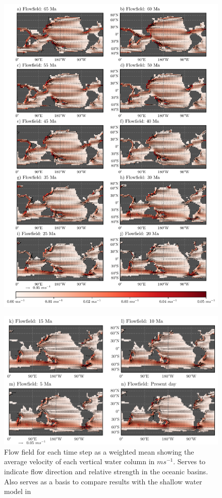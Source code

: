 \documentclass[a4paper]{article}
\begin{document}
\begin{figure}[H]
\includegraphics[width=\linewidth]{flowfield_1.pdf}
\end{figure}
\begin{figure}[H]
\includegraphics[width=\linewidth]{flowfield_2.pdf}
\caption{Flow field for each time step as a weighted mean showing the average velocity of each vertical water column in $m s^{-1}$. Serves to indicate flow direction and relative strength in the oceanic basins. Also serves as a basis to compare results with the shallow water model in  \cite{omta2003physical}}
\label{fig:flowfield}
\end{figure}
\end{document}
